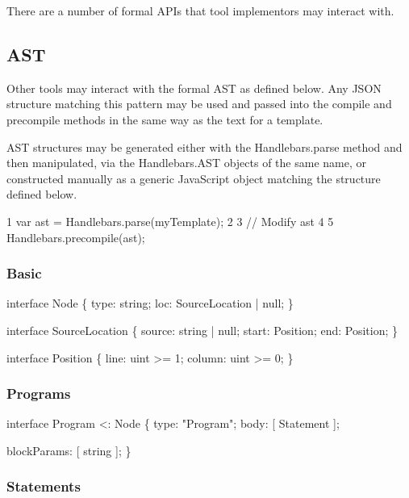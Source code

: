 There are a number of formal A\+P\+Is that tool implementors may interact with.

\subsection*{A\+S\+T}

Other tools may interact with the formal A\+S\+T as defined below. Any J\+S\+O\+N structure matching this pattern may be used and passed into the {\ttfamily compile} and {\ttfamily precompile} methods in the same way as the text for a template.

A\+S\+T structures may be generated either with the {\ttfamily Handlebars.\+parse} method and then manipulated, via the {\ttfamily Handlebars.\+A\+S\+T} objects of the same name, or constructed manually as a generic Java\+Script object matching the structure defined below.


\begin{DoxyCode}
1 var ast = Handlebars.parse(myTemplate);
2 
3 // Modify ast
4 
5 Handlebars.precompile(ast);
\end{DoxyCode}


\subsubsection*{Basic}


\begin{DoxyCode}
\textcolor{keyword}{interface }Node \{
    type: string;
    loc: SourceLocation | null;
\}

\textcolor{keyword}{interface }SourceLocation \{
    source: \textcolor{keywordtype}{string} | null;
    start: Position;
    end: Position;
\}

\textcolor{keyword}{interface }Position \{
    line: uint >= 1;
    column: uint >= 0;
\}
\end{DoxyCode}


\subsubsection*{Programs}


\begin{DoxyCode}
\textcolor{keyword}{interface }Program <: Node \{
    type: \textcolor{stringliteral}{"Program"};
    body: [ Statement ];

    blockParams: [ string ];
\}
\end{DoxyCode}


\subsubsection*{Statements}


